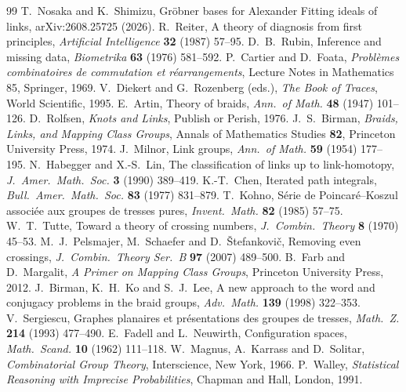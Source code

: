 \documentclass[11pt]{article}
\theoremstyle{definition}\newtheorem{definition}[theorem]{Definition}\newtheorem{remark}[theorem]{Remark}\newtheorem{example}[theorem]{Example}\newtheorem{problem}[theorem]{Open problem}\crefname{problem}{Problem}{Problems}
\begin{document}
\begin{thebibliography}{99}
 T.~Nosaka and K.~Shimizu, Gr\"obner bases for Alexander Fitting ideals of links, arXiv:2608.25725 (2026).
 R.~Reiter, A theory of diagnosis from first principles, \emph{Artificial Intelligence} \textbf{32} (1987) 57--95.
 D.~B.~Rubin, Inference and missing data, \emph{Biometrika} \textbf{63} (1976) 581--592.
 P.~Cartier and D.~Foata, \emph{Probl\`emes combinatoires de commutation et r\'earrangements}, Lecture Notes in Mathematics 85, Springer, 1969.
 V.~Diekert and G.~Rozenberg (eds.), \emph{The Book of Traces}, World Scientific, 1995.
 E.~Artin, Theory of braids, \emph{Ann.\ of Math.} \textbf{48} (1947) 101--126.
 D.~Rolfsen, \emph{Knots and Links}, Publish or Perish, 1976.
 J.~S.~Birman, \emph{Braids, Links, and Mapping Class Groups}, Annals of Mathematics Studies \textbf{82}, Princeton University Press, 1974.
 J.~Milnor, Link groups, \emph{Ann.\ of Math.} \textbf{59} (1954) 177--195.
 N.~Habegger and X.-S.~Lin, The classification of links up to link-homotopy, \emph{J.\ Amer.\ Math.\ Soc.} \textbf{3} (1990) 389--419.
 K.-T.~Chen, Iterated path integrals, \emph{Bull.\ Amer.\ Math.\ Soc.} \textbf{83} (1977) 831--879.
 T.~Kohno, S\'erie de Poincar\'e--Koszul associ\'ee aux groupes de tresses pures, \emph{Invent.\ Math.} \textbf{82} (1985) 57--75.
 W.~T.~Tutte, Toward a theory of crossing numbers, \emph{J.\ Combin.\ Theory} \textbf{8} (1970) 45--53.
 M.~J.~Pelsmajer, M.~Schaefer and D.~\v{S}tefankovi\v{c}, Removing even crossings, \emph{J.\ Combin.\ Theory Ser.\ B} \textbf{97} (2007) 489--500.
 B.~Farb and D.~Margalit, \emph{A Primer on Mapping Class Groups}, Princeton University Press, 2012.
 J.~Birman, K.~H.~Ko and S.~J.~Lee, A new approach to the word and conjugacy problems in the braid groups, \emph{Adv.\ Math.} \textbf{139} (1998) 322--353.
 V.~Sergiescu, Graphes planaires et pr\'esentations des groupes de tresses, \emph{Math.\ Z.} \textbf{214} (1993) 477--490.
 E.~Fadell and L.~Neuwirth, Configuration spaces, \emph{Math.\ Scand.} \textbf{10} (1962) 111--118.
 W.~Magnus, A.~Karrass and D.~Solitar, \emph{Combinatorial Group Theory}, Interscience, New York, 1966.
 P.~Walley, \emph{Statistical Reasoning with Imprecise Probabilities}, Chapman and Hall, London, 1991.

\end{thebibliography}
\end{document}
